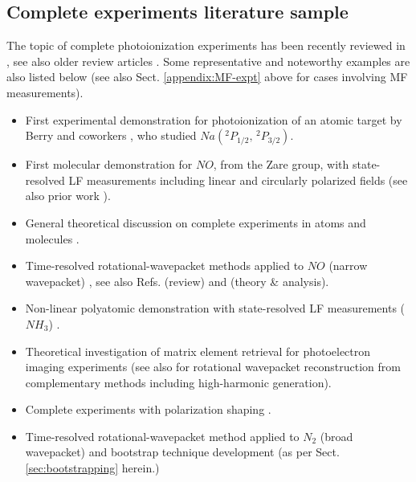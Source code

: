 \documentclass[10pt]{article}
\begin{document}
\subsection{Complete experiments literature sample\label{sec:CompleteLit}}


The topic of complete photoionization experiments has been recently reviewed in \cite{kleinpoppen2013perfect,hockett2018QMP2}, see also older review articles \cite{Becker1998,Reid2003,Kleinpoppen2005}. Some representative and noteworthy examples are also listed below (see also Sect. \ref{appendix:MF-expt} above for cases involving MF measurements).

\begin{itemize}
\item First experimental demonstration for photoionization of an atomic target by Berry and coworkers \cite{Duncanson1976}, who studied
$Na(^{2}P_{1/2},\,^{2}P_{3/2})$.
\item First molecular demonstration for $NO$, from the Zare group, with state-resolved LF measurements including linear and circularly polarized fields \cite{Reid1992} (see also prior work \cite{Allendorf1989,Leahy1991,Reid1991}).
\item General theoretical discussion on complete experiments in atoms and molecules \cite{Cherepkov2005}.
\item Time-resolved rotational-wavepacket methods applied to $NO$ (narrow wavepacket) \cite{Tsubouchi2004,Tang2010}, see also Refs. \cite{Suzuki2006} (review) and \cite{Suzuki2007} (theory \& analysis).
\item Non-linear polyatomic demonstration with state-resolved LF measurements ($NH_3$) \cite{hockett2009RotationallyResolvedPhotoelectron}.
\item Theoretical investigation of matrix element retrieval for photoelectron imaging experiments \cite{Ramakrishna2012} (see also \cite{Ramakrishna2013} for rotational wavepacket reconstruction from complementary methods including high-harmonic generation).  
\item Complete experiments with polarization shaping \cite{hockett2014CompletePhotoionizationExperiments,hockett2015CompletePhotoionizationExperiments}.
\item Time-resolved rotational-wavepacket method applied to $N_2$ (broad wavepacket) and bootstrap technique development \cite{marceau2017MolecularFrameReconstruction} (as per Sect. \ref{sec:bootstrapping} herein.)
\end{itemize} 
\end{document}
